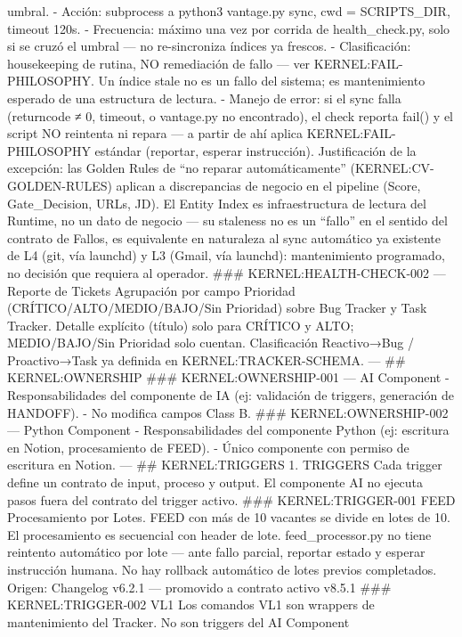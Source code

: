 \documentclass[
]{article}
\begin{document}
umbral. - Acción: subprocess a python3 vantage.py sync, cwd =
SCRIPTS\_DIR, timeout 120s. - Frecuencia: máximo una vez por corrida de
health\_check.py, solo si se cruzó el umbral --- no re-sincroniza
índices ya frescos. - Clasificación: housekeeping de rutina, NO
remediación de fallo --- ver KERNEL:FAIL-PHILOSOPHY. Un índice stale no
es un fallo del sistema; es mantenimiento esperado de una estructura de
lectura. - Manejo de error: si el sync falla (returncode ≠ 0, timeout, o
vantage.py no encontrado), el check reporta fail() y el script NO
reintenta ni repara --- a partir de ahí aplica KERNEL:FAIL-PHILOSOPHY
estándar (reportar, esperar instrucción). Justificación de la excepción:
las Golden Rules de ``no reparar automáticamente''
(KERNEL:CV-GOLDEN-RULES) aplican a discrepancias de negocio en el
pipeline (Score, Gate\_Decision, URLs, JD). El Entity Index es
infraestructura de lectura del Runtime, no un dato de negocio --- su
staleness no es un ``fallo'' en el sentido del contrato de Fallos, es
equivalente en naturaleza al sync automático ya existente de L4 (git,
vía launchd) y L3 (Gmail, vía launchd): mantenimiento programado, no
decisión que requiera al operador. \#\#\# KERNEL:HEALTH-CHECK-002 ---
Reporte de Tickets Agrupación por campo Prioridad
(CRÍTICO/ALTO/MEDIO/BAJO/Sin Prioridad) sobre Bug Tracker y Task
Tracker. Detalle explícito (título) solo para CRÍTICO y ALTO;
MEDIO/BAJO/Sin Prioridad solo cuentan. Clasificación Reactivo→Bug /
Proactivo→Task ya definida en KERNEL:TRACKER-SCHEMA. --- \#\#
KERNEL:OWNERSHIP \#\#\# KERNEL:OWNERSHIP-001 --- AI Component -
Responsabilidades del componente de IA (ej: validación de triggers,
generación de HANDOFF). - No modifica campos Class B. \#\#\#
KERNEL:OWNERSHIP-002 --- Python Component - Responsabilidades del
componente Python (ej: escritura en Notion, procesamiento de FEED). -
Único componente con permiso de escritura en Notion. --- \#\#
KERNEL:TRIGGERS 1. TRIGGERS Cada trigger define un contrato de input,
proceso y output. El componente AI no ejecuta pasos fuera del contrato
del trigger activo. \#\#\# KERNEL:TRIGGER-001 FEED Procesamiento por
Lotes. FEED con más de 10 vacantes se divide en lotes de 10. El
procesamiento es secuencial con header de lote. feed\_processor.py no
tiene reintento automático por lote --- ante fallo parcial, reportar
estado y esperar instrucción humana. No hay rollback automático de lotes
previos completados. Origen: Changelog v6.2.1 --- promovido a contrato
activo v8.5.1 \#\#\# KERNEL:TRIGGER-002 VL1 Los comandos VL1 son
wrappers de mantenimiento del Tracker. No son triggers del AI Component
\end{document}
